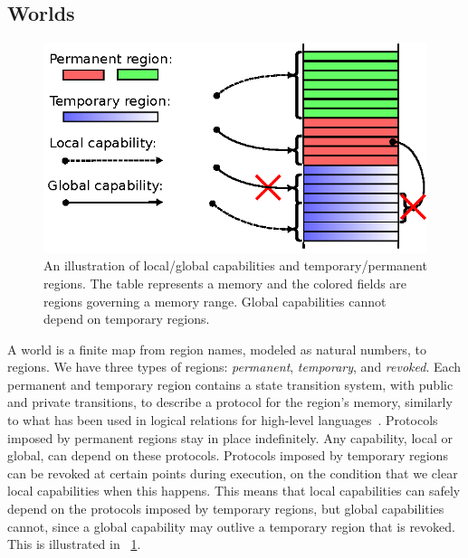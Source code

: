 \documentclass[compsoc,conference,letterpaper,fleqn]{IEEEtran}
\newcommand\lau[1]{{\color{purple} \sf \footnotesize {LS: #1}}\\}
\newcommand\dominique[1]{{\color{purple} \sf \footnotesize {DD: #1}}\\}
\renewcommand\lau[1]{}
\renewcommand\dominique[1]{}
\newcommand{\plainview}[1]{\mathrm{#1}}
\newcommand{\perma}{\plainview{perm}}
\newcommand{\temp}{\plainview{temp}}
\newcommand{\revoked}{\plainview{revoked}}
\begin{document}
\subsection{Worlds}
\begin{figure}
  \centering
  \includegraphics{w11}
  \caption{An illustration of local/global capabilities and temporary/permanent
    regions. The table represents a memory and the colored fields are regions
    governing a memory range. Global capabilities cannot depend on temporary
    regions.}
  \label{fig:cap-world}
\end{figure}
A world is a finite map from region names, modeled as natural numbers, to regions.
We have three types of regions: \emph{permanent}, \emph{temporary}, and \emph{revoked}.
Each permanent and temporary region contains a state transition system, with
public and private transitions, to describe a protocol for the region's memory,
similarly to what has been used in logical relations for high-level
languages~\citep{Ahmed:popl09,Dreyer:jfp12,Devriese:2016ObjCap}. Protocols
imposed by permanent regions stay in place indefinitely. Any capability, local
or global, can depend on these protocols. Protocols imposed by temporary regions
can be revoked at certain points during execution, on the condition that we
clear local capabilities when this happens. This means that local capabilities
can safely depend on the protocols imposed by temporary regions, but global
capabilities cannot, since a global capability may outlive a temporary region
that is revoked. This is illustrated in \figurename~\ref{fig:cap-world}.
\end{document}
